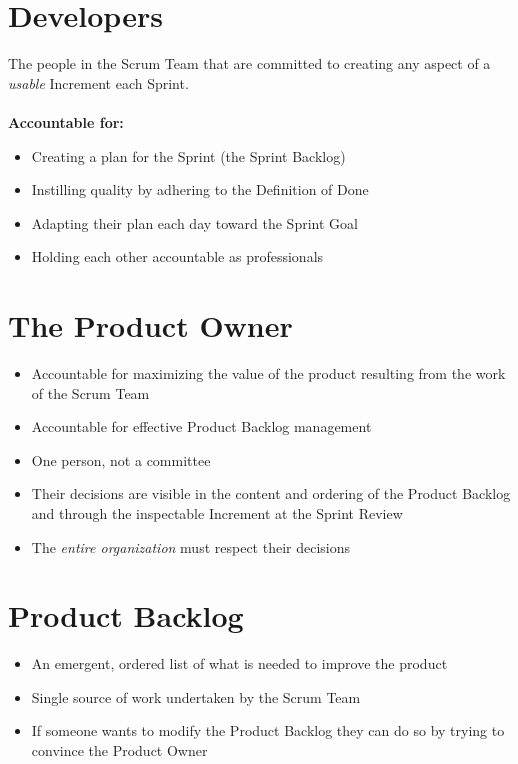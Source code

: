\documentclass[a4paper,11pt,twocolumn]{article}
\begin{document}
\section*{Developers}
The people in the Scrum Team that are committed to creating any aspect of a \textit{usable} Increment each Sprint.
\\\\
\textbf{Accountable for:}
\begin{itemize}
	\item Creating a plan for the Sprint (the Sprint Backlog)
	\item Instilling quality by adhering to the Definition of Done
	\item Adapting their plan each day toward the Sprint Goal
	\item Holding each other accountable as professionals
\end{itemize}

\section*{The Product Owner}
\begin{itemize}
	\item Accountable for maximizing the value of the product resulting from the work of the Scrum Team
	\item Accountable for effective Product Backlog management
	\item One person, not a committee
	\item Their decisions are visible in the content and ordering of the Product Backlog and through the inspectable Increment at the Sprint Review
	\item The \textit{entire organization} must respect their decisions
\end{itemize}

\section*{Product Backlog}
\begin{itemize}
	\item An emergent, ordered list of what is needed to improve the product
	\item Single source of work undertaken by the Scrum Team
	\item If someone wants to modify the Product Backlog they can do so by trying to convince the Product Owner
\end{itemize}
\end{document}
